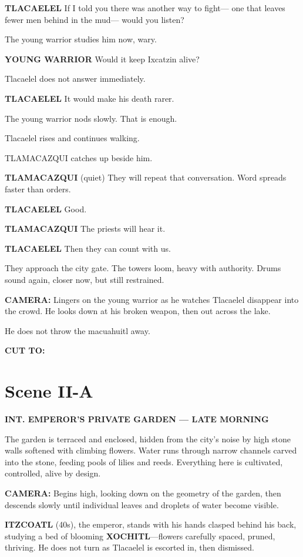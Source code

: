 \documentclass[12pt]{article}
\begin{document}
\textbf{TLACAELEL}  
If I told you there was another way to fight—  
one that leaves fewer men behind in the mud—  
would you listen?

The young warrior studies him now, wary.

\textbf{YOUNG WARRIOR}  
Would it keep Ixcatzin alive?

Tlacaelel does not answer immediately.

\textbf{TLACAELEL}  
It would make his death rarer.

The young warrior nods slowly. That is enough.

Tlacaelel rises and continues walking.

TLAMACAZQUI catches up beside him.

\textbf{TLAMACAZQUI}  
(quiet)  
They will repeat that conversation.  
Word spreads faster than orders.

\textbf{TLACAELEL}  
Good.

\textbf{TLAMACAZQUI}  
The priests will hear it.

\textbf{TLACAELEL}  
Then they can count with us.

They approach the city gate. The towers loom, heavy with authority. Drums sound again, closer now, but still restrained.

\textbf{CAMERA:} Lingers on the young warrior as he watches Tlacaelel disappear into the crowd. He looks down at his broken weapon, then out across the lake.

He does not throw the macuahuitl away.

\textbf{CUT TO:}

\section*{Scene II-A}

\textbf{INT. EMPEROR’S PRIVATE GARDEN — LATE MORNING}

The garden is terraced and enclosed, hidden from the city’s noise by high stone walls softened with climbing flowers. Water runs through narrow channels carved into the stone, feeding pools of lilies and reeds. Everything here is cultivated, controlled, alive by design.

\textbf{CAMERA:} Begins high, looking down on the geometry of the garden, then descends slowly until individual leaves and droplets of water become visible.

\textbf{ITZCOATL} (40s), the emperor, stands with his hands clasped behind his back, studying a bed of blooming \textbf{XOCHITL}—flowers carefully spaced, pruned, thriving. He does not turn as Tlacaelel is escorted in, then dismissed.
\end{document}
